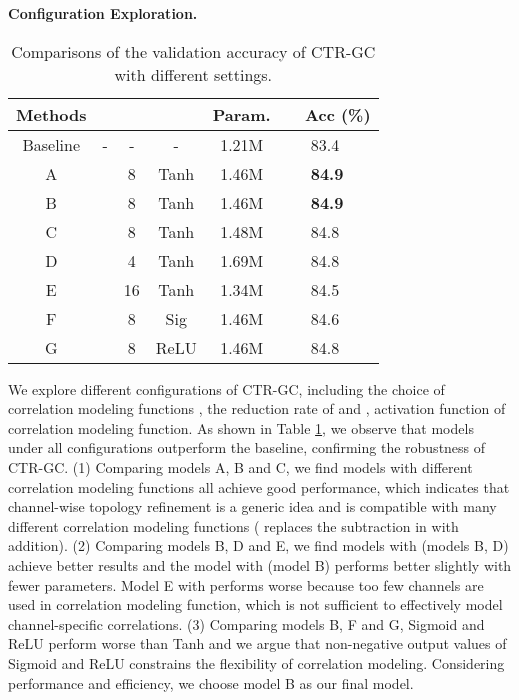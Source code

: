 \documentclass[10pt,twocolumn,letterpaper]{article}
\begin{document}
\noindent \textbf{Configuration Exploration.}
\begin{table}
	\begin{center}
		\begin{tabular}{c c c c c l}
			\hline
			\textbf{Methods} &  &  &  & \textbf{Param.} & \ \ \textbf{Acc (\%)}\\
			\hline\hline
			Baseline & - & - & -  & 1.21M & \ \ \ 83.4 \\
			\hline
			A &  & 8 & Tanh &  1.46M & \ \ \ \textbf{84.9}\\
			B &  & 8 & Tanh &  1.46M & \ \ \ \textbf{84.9}\\
			C &  & 8 & Tanh & 1.48M & \ \ \ 84.8\\
			\hline
			D &  &4 & Tanh &  1.69M & \ \ \ 84.8\\
			E &  &16 & Tanh & 1.34M & \ \ \ 84.5\\
			\hline
			F &  &8 & Sig & 1.46M & \ \ \ 84.6\\
			G &  &8 & ReLU & 1.46M & \ \ \ 84.8\\
			\hline
		\end{tabular}
	\end{center}
	\vspace{-0.2cm}
	\caption{Comparisons of the validation accuracy of CTR-GC with different settings.}
	\vspace{-0.5cm}
	\label{tab:config}
\end{table}
We explore different configurations of CTR-GC, including the choice of correlation modeling functions , the reduction rate  of  and , activation function  of correlation modeling function. As shown in Table \ref{tab:config}, we observe that models under all configurations outperform the baseline, confirming the robustness of CTR-GC. (1) Comparing models A, B and C, we find models with different correlation modeling functions all achieve good performance, which indicates that channel-wise topology refinement is a generic idea and is compatible with many different correlation modeling functions ( replaces the subtraction in  with addition). (2) Comparing models B, D and E, we find models with  (models B, D) achieve better results and the model with  (model B) performs better slightly with fewer parameters. Model E with  performs worse because too few channels are used in correlation modeling function, which is not sufficient to effectively model channel-specific correlations. (3) Comparing models B, F and G, Sigmoid and ReLU perform worse than Tanh and we argue that non-negative output values of Sigmoid and ReLU constrains the flexibility of correlation modeling. Considering performance and efficiency, we choose model B as our final model.
\end{document}
